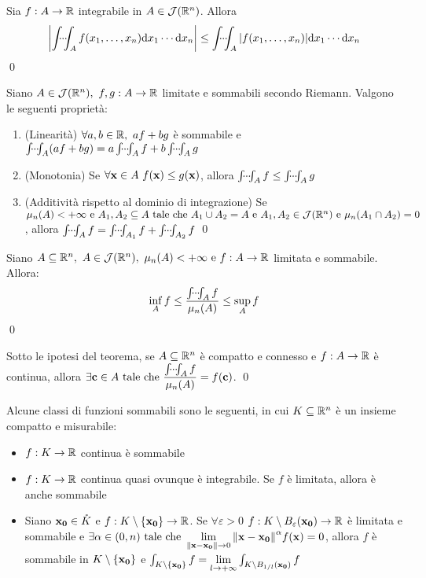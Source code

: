 \begin{theorem}
    Sia $f: A \to \mathbb{R}$ integrabile in $A \in \mathcal{J}(\mathbb{R}^n)$. Allora
    $$
        \abs{\idotsint_A f(x_1,\dots,x_n)\dd x_1\cdots \dd x_n} \leq \idotsint_A\abs{f(x_1,\dots,x_n)}\dd x_1\cdots \dd x_n
    $$
    \qed
\end{theorem}

\begin{theorem}
    Siano $A \in \mathcal{J}(\mathbb{R}^n), \ f,g: A \to \mathbb{R}$ limitate e sommabili secondo Riemann. Valgono le seguenti proprietà:
    \begin{enumerate}
        \item (Linearità) $\forall a,b \in \mathbb{R}, \ af + bg$ è sommabile e $\idotsint_A(af+bg)=a\idotsint_A f+b\idotsint_A g$
        \item (Monotonia) Se $\forall \vb{x} \in A \ f(\vb{x}) \leq g(\vb{x})$, allora $\idotsint_A f \leq \idotsint_A g$
        \item (Additività rispetto al dominio di integrazione) Se $\mu_n(A) < + \infty \text{ e } A_1,A_2 \subseteq A \text{ tale che } A_1 \cup A_2 = A \text{ e } A_1,A_2 \in \mathcal{J}(\mathbb{R}^n) \text{ e } \mu_n(A_1 \cap A_2)=0$, allora $\idotsint_A f= \idotsint_{A_1} f+ \idotsint_{A_2} f$
        \qed
    \end{enumerate}
\end{theorem}

\begin{theorem}
    Siano $A \subseteq \mathbb{R}^n, \ A \in \mathcal{J}(\mathbb{R}^n), \ \mu_n(A) < +\infty \text{ e } f: A \to \mathbb{R}$ limitata e sommabile. Allora:
    $$
        \inf_A f \leq \frac{\idotsint_A f}{\mu_n(A)}\leq \sup_A f
    $$
    \qed
\end{theorem}

\begin{corollary}
    Sotto le ipotesi del teorema, se $A \subseteq \mathbb{R}^n$ è compatto e connesso e $f: A \to \mathbb{R}$ è continua, allora $\exists \vb{c} \in A \text{ tale che } \displaystyle\frac{\idotsint_A f}{\mu_n(A)}=f(\vb{c})$.
    \qed
\end{corollary}

Alcune classi di funzioni sommabili sono le seguenti, in cui $K\subseteq\mathbb{R}^n$ è un insieme compatto e misurabile:
\begin{itemize}
    \item $f:K\to\mathbb{R}$ continua è sommabile
    \item $f:K\to\mathbb{R}$ continua quasi ovunque è integrabile. Se $f$ è limitata, allora è anche sommabile
    \item Siano $\vb{x_0} \in \mathring{K}$ e $f:K\setminus\{\vb{x_0}\}\to\mathbb{R}$. Se $\forall \varepsilon>0$ $f:K\setminus B_\varepsilon(\vb{x_0})\to\mathbb{R}$ è limitata e sommabile e $\exists \alpha \in (0,n) \text{ tale che } \lim\limits_{\norm{\vb{x}-\vb{x_0}}\to 0}\norm{\vb{x}-\vb{x_0}}^\alpha f(\vb{x})=0$, allora $f$ è sommabile in $K\setminus\{\vb{x_0}\}$ e $\int_{K\setminus\{\vb{x_0}\}}f=\lim\limits_{l\to+\infty}\int_{K\setminus B_{1/l}(\vb{x_0})}f$
\end{itemize}

